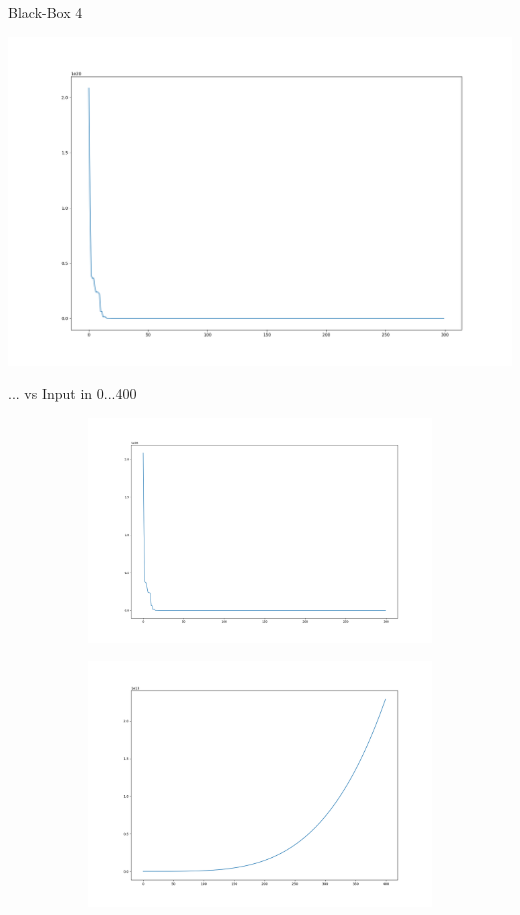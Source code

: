 \documentclass{ocbeameruni}
\begin{document}
\begin{frame}{Black-Box 4}
    \begin{center}
    \includegraphics[scale=0.25]{plots/bb4_2.png}
    \end{center}
\end{frame}


\begin{frame}{... vs Input in 0...400}
\begin{figure}
\centering
\begin{subfigure}
  \centering
  \includegraphics[width=.5\linewidth]{plots/bb4_2.png}
\end{subfigure}
\begin{subfigure}
  \centering
  \includegraphics[width=.5\linewidth]{plots/bb4_distr.png}
\end{subfigure}
\end{figure}
\end{frame}
\end{document}
